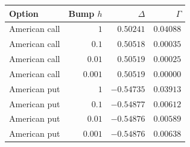 \begin{tabular}{lrrr}
\toprule
Option & Bump $h$ & $\Delta$ & $\Gamma$ \\
\midrule
American call & $1$ & $0.50241$ & $0.04088$ \\
American call & $0.1$ & $0.50518$ & $0.00035$ \\
American call & $0.01$ & $0.50519$ & $0.00025$ \\
American call & $0.001$ & $0.50519$ & $0.00000$ \\
American put & $1$ & $-0.54735$ & $0.03913$ \\
American put & $0.1$ & $-0.54877$ & $0.00612$ \\
American put & $0.01$ & $-0.54876$ & $0.00589$ \\
American put & $0.001$ & $-0.54876$ & $0.00638$ \\
\bottomrule
\end{tabular}

